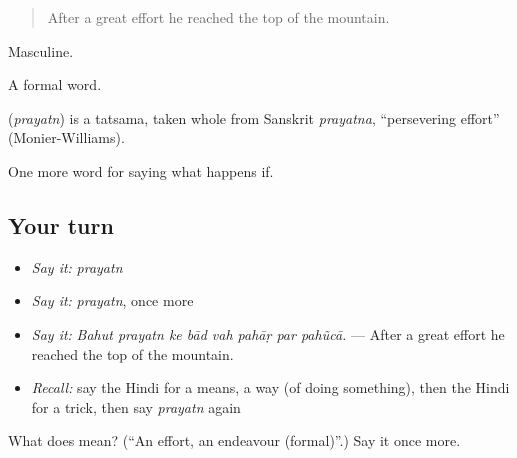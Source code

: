 \begin{quote}
After a great effort he reached the top of the mountain.
\end{quote}

Masculine.

A formal word.

\begin{cousinweb}
\textbf{} (\emph{prayatn}) is a tatsama, taken whole from Sanskrit \emph{prayatna}, \textquotedblleft{}persevering effort\textquotedblright{} (Monier-Williams).
\end{cousinweb}

\begin{grammarlens}[title={What you've built}]
One more word for saying what happens if.
\end{grammarlens}

\subsection*{Your turn}
\begin{itemize}
\raggedright
  \item \emph{Say it:} \emph{prayatn}
  \item \emph{Say it:} \emph{prayatn}, once more
  \item \emph{Say it:} \emph{Bahut prayatn ke bād vah pahāṛ par pahũcā.} — After a great effort he reached the top of the mountain.
  \item \emph{Recall:} say the Hindi for a means, a way (of doing something), then the Hindi for a trick, then say \emph{prayatn} again
\end{itemize}

\begin{tcolorbox}[breakable,colback=teal!4,colframe=teal!35!black,title={Before you move on}]
What does  mean? (\textquotedblleft{}An effort, an endeavour (formal)\textquotedblright{}.) Say it once more.
\end{tcolorbox}
